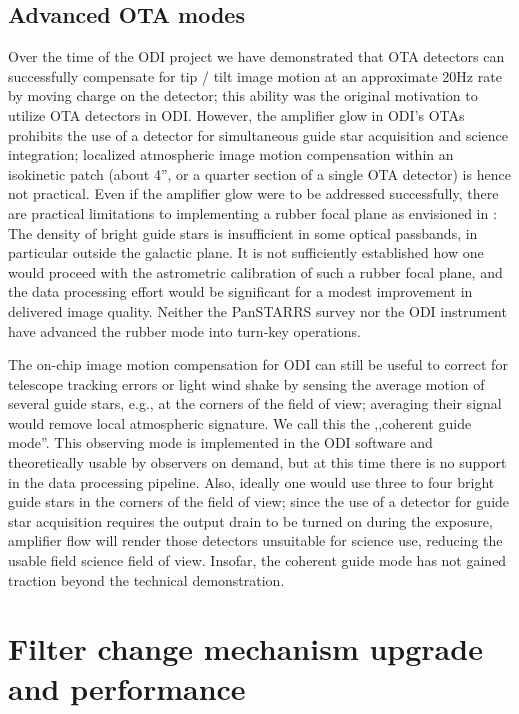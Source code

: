 \documentclass[]{spieman}
\begin{document}
\subsection{Advanced OTA modes}

Over the time of the ODI project we have demonstrated that OTA detectors can
successfully compensate for tip / tilt image motion at an approximate 20Hz rate
by moving charge on the detector; this ability was the original motivation to
utilize OTA detectors in ODI.  However, the amplifier glow in ODI's OTAs
prohibits the use of a detector for simultaneous guide star acquisition and
science integration; localized atmospheric image motion compensation within an
isokinetic patch (about 4'', or a quarter section of a single OTA detector) is
hence not practical. Even if the amplifier glow were to be addressed
successfully, there are practical limitations to implementing a rubber focal
plane as envisioned in \cite{tonry2002}: The density of  bright guide stars is
insufficient in some  optical passbands, in particular outside the galactic
plane. It is not sufficiently established how one would proceed with the
astrometric calibration of such a rubber focal plane, and the data processing
effort would be significant for a modest improvement in delivered image quality.
Neither the PanSTARRS survey nor the ODI instrument have advanced the rubber
mode into turn-key operations.

The on-chip image motion compensation for ODI can still be useful to correct for
telescope tracking errors or light wind shake by sensing the average motion of
several guide stars, e.g., at the corners of the field of view; averaging their
signal would remove local atmospheric signature. We call this the ,,coherent
guide mode''. This observing mode is implemented in the ODI software and
theoretically usable by observers on demand, but at this time there is no
support in the  data processing pipeline. Also, ideally one would use three to
four bright guide stars in the corners of the field of view; since the use of a
detector for guide star acquisition requires the output drain to be turned on
during the exposure, amplifier flow will render those detectors unsuitable for
science use, reducing the usable field science field of view. Insofar, the
coherent guide mode has not gained traction beyond the technical demonstration.



\section{Filter change mechanism upgrade and performance}
\end{document}
